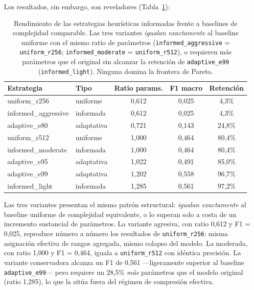 Los resultados, sin embargo, son reveladores
(Tabla~\ref{tab:informed-heuristic}):

\begin{table}[ht]
\centering
\caption{Rendimiento de las estrategias heurísticas informadas frente a
baselines de complejidad comparable. Las tres variantes \emph{igualan
exactamente} al baseline uniforme con el mismo ratio de parámetros
(\texttt{informed\_aggressive} = \texttt{uniform\_r256};
\texttt{informed\_moderate} = \texttt{uniform\_r512}), o requieren más
parámetros que el original sin alcanzar la retención de
\texttt{adaptive\_e99} (\texttt{informed\_light}). Ninguna domina la
frontera de Pareto.}
\label{tab:informed-heuristic}
\small
\begin{tabular}{llccc}
\toprule
\textbf{Estrategia} & \textbf{Tipo} & \textbf{Ratio params.} & \textbf{F1 macro} & \textbf{Retención} \\
\midrule
uniform\_r256        & uniforme   & 0{,}612 & 0{,}025 & 4{,}3\% \\
informed\_aggressive & informada  & 0{,}612 & 0{,}025 & 4{,}3\% \\
\midrule
adaptive\_e80        & adaptativa & 0{,}721 & 0{,}143 & 24{,}8\% \\
\midrule
uniform\_r512        & uniforme   & 1{,}000 & 0{,}464 & 80{,}4\% \\
informed\_moderate   & informada  & 1{,}000 & 0{,}464 & 80{,}4\% \\
\midrule
adaptive\_e95        & adaptativa & 1{,}022 & 0{,}491 & 85{,}0\% \\
adaptive\_e99        & adaptativa & 1{,}202 & 0{,}558 & 96{,}7\% \\
informed\_light      & informada  & 1{,}285 & 0{,}561 & 97{,}2\% \\
\bottomrule
\end{tabular}
\end{table}

Las tres variantes presentan el mismo patrón estructural: \emph{igualan
exactamente} al baseline uniforme de complejidad equivalente, o lo superan
solo a costa de un incremento sustancial de parámetros. La variante
agresiva, con ratio 0{,}612 y F1 = 0{,}025, reproduce número a número los
resultados de \texttt{uniform\_r256}: misma asignación efectiva de rangos
agregada, mismo colapso del modelo. La moderada, con ratio 1{,}000 y
F1 = 0{,}464, iguala a \texttt{uniform\_r512} con idéntica precisión.
La variante conservadora alcanza un F1 de 0{,}561 ---ligeramente
superior al baseline \texttt{adaptive\_e99}--- pero requiere un 28{,}5\%
\emph{más} parámetros que el modelo original (ratio 1{,}285), lo que la
sitúa fuera del régimen de compresión efectiva.

